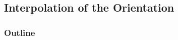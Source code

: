 \documentclass[10pt, aspectratio=169]{beamer}
\theoremstyle{remark}
\theoremstyle{definition}
\begin{document}
\subsection{Interpolation of the Orientation}
\begin{frame}
	\frametitle{Outline} %
\end{frame}
\end{document}

